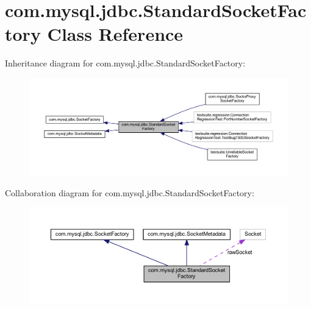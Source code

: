 \hypertarget{classcom_1_1mysql_1_1jdbc_1_1_standard_socket_factory}{}\section{com.\+mysql.\+jdbc.\+Standard\+Socket\+Factory Class Reference}
\label{classcom_1_1mysql_1_1jdbc_1_1_standard_socket_factory}


Inheritance diagram for com.\+mysql.\+jdbc.\+Standard\+Socket\+Factory\+:
\nopagebreak
\begin{figure}[H]
\begin{center}
\leavevmode
\includegraphics[width=350pt]{classcom_1_1mysql_1_1jdbc_1_1_standard_socket_factory__inherit__graph}
\end{center}
\end{figure}


Collaboration diagram for com.\+mysql.\+jdbc.\+Standard\+Socket\+Factory\+:
\nopagebreak
\begin{figure}[H]
\begin{center}
\leavevmode
\includegraphics[width=350pt]{classcom_1_1mysql_1_1jdbc_1_1_standard_socket_factory__coll__graph}
\end{center}
\end{figure}
